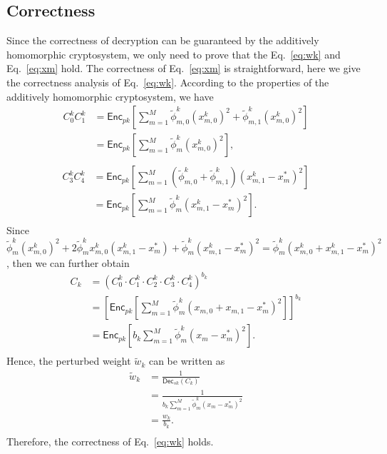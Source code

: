 \documentclass[conference]{IEEEtran}
\begin{document}
\subsection{Correctness}
Since the correctness of decryption can be guaranteed by the additively homomorphic cryptosystem, we only need to prove that the Eq.~\ref{eq:wk} and Eq.~\ref{eq:xm} hold.
The correctness of Eq.~\ref{eq:xm} is straightforward, here we give the correctness analysis of Eq.~\ref{eq:wk}.
According to the properties of the additively homomorphic cryptosystem, we have
\begin{equation*}
  \begin{split}
  C_0^k C_1^k & = \mathsf{Enc}_{pk}\left[\sum_{m=1}^M \tilde{\phi}_{m,0}^k\left(x_{m,0}^k\right)^2 + \tilde{\phi}_{m,1}^k\left(x_{m,0}^k\right)^2  \right] \\
   & = \mathsf{Enc}_{pk}\left[\sum_{m=1}^M \tilde{\phi}_m^k\left(x_{m,0}^k\right)^2 \right] , \\
  \end{split}
\end{equation*}
\begin{equation*}
  \begin{split}
  C_3^kC_4^k & = \mathsf{Enc}_{pk}\left[\sum_{m=1}^M \left(\tilde{\phi}_{m,0}^k + \tilde{\phi}_{m,1}^k\right) \left(x_{m,1}^k-x_m^*\right)^2 \right] \\
  & = \mathsf{Enc}_{pk}\left[\sum_{m=1}^M \tilde{\phi}_m^k\left(x_{m,1}^k - x_m^*\right)^2\right] . \\
  \end{split}
\end{equation*}
Since $\tilde{\phi}_m^k (x_{m,0}^k)^2 + 2\tilde{\phi}_m^kx_{m,0}^k\left(x_{m,1}^k - x_m^*\right) + \tilde{\phi}_m^k(x_{m,1}^k - x_m^*)^2 = \tilde{\phi}_m^k (x_{m,0}^k + x_{m,1}^k - x_m^*)^2$, then we can further obtain
\begin{equation*}
  \begin{split}
  C_k & = \left(C_0^k \cdot C_1^k\cdot C_2^k \cdot C_3^k \cdot C_4^k\right)^{b_k} \\
   & = \left[\mathsf{Enc}_{pk}\left[\sum_{m=1}^M \tilde{\phi}_m^k (x_{m,0} + x_{m,1} - x_m^*)^2 \right]\right]^{b_k} \\
  & = \mathsf{Enc}_{pk}\left[b_k \sum_{m=1}^M \tilde{\phi}_m^k (x_m - x_m^*)^2 \right] . \\
  \end{split}
\end{equation*}
Hence, the perturbed weight $\tilde{w}_k$ can be written as
\begin{equation*}
  \begin{split}
  \tilde{w}_k & = \frac{1}{\mathsf{Dec}_{sk}\left(C_k\right)} \\
  & = \frac{1}{b_k \sum_{m=1}^M \tilde{\phi}_m^k (x_m - x_m^*)^2} \\
  & = \frac{w_k}{b_k} . \\
  \end{split}
\end{equation*}
Therefore, the correctness of Eq.~\ref{eq:wk} holds.
\end{document}
